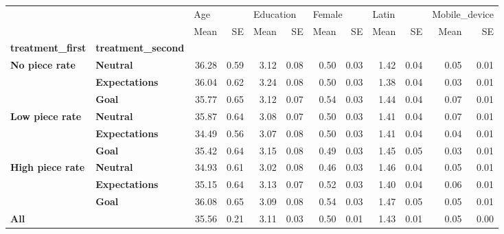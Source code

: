 \begin{tabular}{llrrrrrrrrrr}
\toprule
    &      & \multicolumn{2}{l}{Age} & \multicolumn{2}{l}{Education} & \multicolumn{2}{l}{Female} & \multicolumn{2}{l}{Latin} & \multicolumn{2}{l}{Mobile\_device} \\
    &      &  Mean &   SE &      Mean &   SE &   Mean &   SE &  Mean &   SE &          Mean &   SE \\
\textbf{treatment\_first} & \textbf{treatment\_second} &       &      &           &      &        &      &       &      &               &      \\
\midrule
\textbf{No piece rate} & \textbf{Neutral} & 36.28 & 0.59 &      3.12 & 0.08 &   0.50 & 0.03 &  1.42 & 0.04 &          0.05 & 0.01 \\
    & \textbf{Expectations} & 36.04 & 0.62 &      3.24 & 0.08 &   0.50 & 0.03 &  1.38 & 0.04 &          0.03 & 0.01 \\
    & \textbf{Goal} & 35.77 & 0.65 &      3.12 & 0.07 &   0.54 & 0.03 &  1.44 & 0.04 &          0.07 & 0.01 \\
\textbf{Low piece rate} & \textbf{Neutral} & 35.87 & 0.64 &      3.08 & 0.07 &   0.50 & 0.03 &  1.41 & 0.04 &          0.07 & 0.01 \\
    & \textbf{Expectations} & 34.49 & 0.56 &      3.07 & 0.08 &   0.50 & 0.03 &  1.41 & 0.04 &          0.04 & 0.01 \\
    & \textbf{Goal} & 35.42 & 0.64 &      3.15 & 0.08 &   0.49 & 0.03 &  1.45 & 0.05 &          0.03 & 0.01 \\
\textbf{High piece rate} & \textbf{Neutral} & 34.93 & 0.61 &      3.02 & 0.08 &   0.46 & 0.03 &  1.46 & 0.04 &          0.05 & 0.01 \\
    & \textbf{Expectations} & 35.15 & 0.64 &      3.13 & 0.07 &   0.52 & 0.03 &  1.40 & 0.04 &          0.06 & 0.01 \\
    & \textbf{Goal} & 36.08 & 0.65 &      3.09 & 0.08 &   0.54 & 0.03 &  1.47 & 0.05 &          0.05 & 0.01 \\
\textbf{All} &      & 35.56 & 0.21 &      3.11 & 0.03 &   0.50 & 0.01 &  1.43 & 0.01 &          0.05 & 0.00 \\
\bottomrule
\end{tabular}
